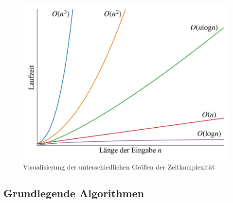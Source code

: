 \begin{figure}[!b]
	\includegraphics[scale=0.17]{Abbildungen/Time_complexities.jpg}
	\centering
	\caption{Visualisierung der unterschiedlichen Größen der Zeitkomplexität}
	\label{fig: time_complexity}
\end{figure}

\subsection{Grundlegende Algorithmen}